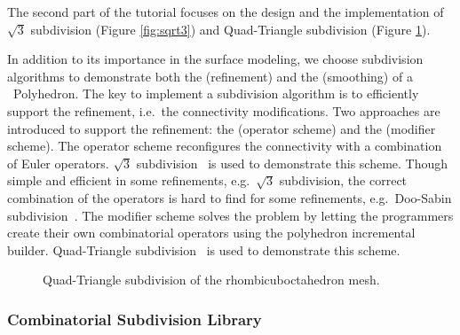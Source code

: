 \documentclass[twocolumn]{article}
\begin{document}
The second part of the tutorial focuses on the design and the
implementation of $\sqrt{3}$ subdivision (Figure \ref{fig:sqrt3}) 
and Quad-Triangle subdivision (Figure \ref{fig:quad-triangle}).  

In addition to its importance in the surface modeling, we 
choose subdivision algorithms to demonstrate both the 
 (refinement) and the
 (smoothing) of a
\cgal\  Polyhedron. 
The key to implement a subdivision algorithm is to efficiently support
the refinement, i.e.\ the connectivity modifications. Two approaches
are introduced to support the refinement: the  (operator scheme) and
the  (modifier scheme). 
The operator scheme reconfigures the connectivity with a 
combination of Euler operators. $\sqrt{3}$ subdivision~\cite{sqrt3} is
used to demonstrate this scheme. Though simple and efficient in some
refinements, e.g.\ $\sqrt{3}$ subdivision, the correct combination of
the operators is hard to find for some refinements, e.g.\ Doo-Sabin
subdivision~\cite{ds}. The modifier scheme solves the problem by
letting the programmers create their own combinatorial operators 
using the polyhedron incremental builder. Quad-Triangle
subdivision~\cite{qts,l-pg-03} is used to demonstrate this scheme.


\begin{figure}[t]
    \caption{Quad-Triangle subdivision of the rhombicuboctahedron mesh.}
    \label{fig:quad-triangle}
\end{figure}


\subsubsection*{Combinatorial Subdivision Library}
\end{document}
